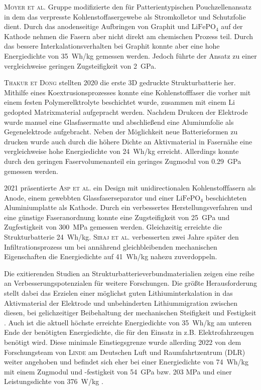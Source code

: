 \textsc{Moyer et al.} \cite{Moyer2020} Gruppe modifizierte den für Patterientypischen Pouchzellenansatz in dem das verpresste Kohlenstoffasergewebe als Stromkolletor und Schutzfolie dient. Durch das anodenseitige Aufbringen von Graphit und $\text{LiFePO}_\text{4}$ auf der Kathode nehmen die Fasern aber nicht direkt am chemischen Prozess teil. Durch das bessere Interkalationsverhalten bei Graphit konnte aber eine hohe Energiedichte von 35~Wh/kg gemessen werden. Jedoch führte der Ansatz zu einer vergleichweise geringen Zugsteifigkeit von 2~GPa.

\textsc{Thakur et Dong} \cite{Thakur2020} stellten 2020 die erste 3D gedruckte Strukturbatterie her. Mithilfe eines Koextrusionsprozesses konnte eine Kohlenstofffaser die vorher mit einem festen Polymerelktrolyte beschichtet wurde, zusammen mit einem Li gedopted Matrixmaterial aufgepracht werden. Nachdem Drukcen der Elektrode wurde manuel eine Glasfasermatte und abschließend eine Alumiumfolie als Gegenelektrode aufgebracht. Neben der Möglichkeit neue Batterieformen zu drucken wurde auch durch die höhere Dichte an Aktivmaterial in Fasernähe eine vergleichweise hohe Energiedichte von 24~Wh/kg erreicht. Allerdings konnte durch den geringen Faservolumenanteil ein geringes Zugmodul von 0.29~GPa gemessen werden.

2021 präsentierte \textsc{Asp et al.} \cite{Asp2021} ein Design mit unidirectionalen Kohlenstofffasern als Anode, einem gewebbten Glassfaserseparator und einer $\text{LiFePO}_\text{4}$ beschichteten Aluminiumplatte als Kathode. Durch ein verbessertes Herstellungsverfahren und eine günstige Faseranordnung konnte eine Zugsteifigkeit von 25~GPa und Zugfestigkeit von 300~MPa gemessen werden. Gleichzeitig erreichte die Strukturbatterie 24~Wh/kg. \textsc{Siraj et al.} \cite{Siraj2023} verbesserten zwei Jahre später den Infiltrationsprozess um bei annährend gleichbleibenden mechanischen Eigenschaften die Energiedichte auf 41~Wh/kg nahezu zuverdoppeln.



Die exitierenden Studien an Strukturbatterieverbundmaterialien zeigen eine reihe an Verbesserungspotenzialen für weitere Forschungen. Die größte Herausforderung stellt dabei das Erzielen einer möglichst guten Lithiuminterkalation in das Aktivmaterial der Elektrode und unbehinderten Lithiummigration zwischen diesen, bei gelichzeitiger Beibehaltung der mechanischen Steifigkeit und Festigkeit \cite{Asp2015}.
Auch ist die aktuell höchste erreichte Energiedichte von 35~Wh/kg am unteren Ende der benötigten Energiedichte, die für den Einsatz in z.B. Elektrofahrzeugen benötigt wird. Diese minimale Einstiegsgrenze wurde allerding 2022 von dem Forschungsteam von \textsc{Linde} am Deutschen Luft und Raumfahrtzentrum (DLR) weiter angehoben und befindet sich eher bei einer Energiedichte von 74~Wh/kg mit einem Zugmodul und -festigkeit von 54~GPa bzw. 203 MPa und einer Leistungsdichte von 376~W/kg \cite{Ishfaq2022}.

